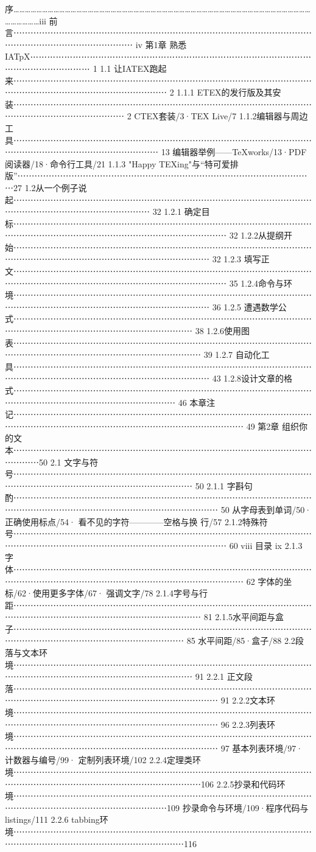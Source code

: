 \documentclass[UTF8]{ctexart}
\begin{document}
序…………………………………………………………………………………………………………………………………………………………iii
前言⋯⋯⋯⋯⋯⋯⋯⋯⋯⋯⋯⋯⋯⋯⋯⋯⋯⋯⋯⋯⋯⋯⋯⋯⋯⋯⋯⋯⋯⋯⋯⋯⋯⋯⋯⋯⋯⋯⋯⋯⋯⋯⋯⋯⋯⋯⋯⋯⋯⋯ iv
第1章	熟悉IATpX⋯⋯⋯⋯⋯⋯⋯⋯⋯⋯⋯⋯⋯⋯⋯⋯⋯⋯⋯⋯⋯⋯⋯⋯⋯⋯⋯⋯⋯⋯⋯⋯⋯⋯⋯⋯⋯⋯⋯⋯⋯⋯⋯ 1
1.1 让IATEX跑起来⋯⋯⋯⋯⋯⋯⋯⋯⋯⋯⋯⋯⋯⋯⋯⋯⋯⋯⋯⋯⋯⋯⋯⋯⋯⋯⋯⋯⋯⋯⋯⋯⋯⋯⋯⋯⋯⋯⋯⋯⋯⋯⋯⋯⋯⋯⋯⋯⋯⋯⋯⋯⋯⋯ 2
1.1.1 ETEX的发行版及其安装⋯⋯⋯⋯⋯⋯⋯⋯⋯⋯⋯⋯⋯⋯⋯⋯⋯⋯⋯⋯⋯⋯⋯⋯⋯⋯⋯⋯⋯⋯⋯⋯⋯⋯⋯⋯⋯⋯⋯⋯⋯⋯⋯⋯⋯⋯⋯⋯⋯ 2
CTEX套装/3·TEX Live/7
1.1.2编辑器与周边工具⋯⋯⋯⋯⋯⋯⋯⋯⋯⋯⋯⋯⋯⋯⋯⋯⋯⋯⋯⋯⋯⋯⋯⋯⋯⋯⋯⋯⋯⋯⋯⋯⋯⋯⋯⋯⋯⋯⋯⋯⋯⋯⋯⋯⋯⋯⋯⋯⋯⋯⋯⋯⋯ 13
编辑器举例——TeXworks/13·PDF阅读器/18·命令行工具/21
1.1.3 "Happy TEXing"与“特可爱排版”⋯⋯⋯⋯⋯⋯⋯⋯⋯⋯⋯⋯⋯⋯⋯⋯⋯⋯⋯⋯⋯⋯⋯⋯⋯⋯⋯⋯⋯⋯⋯⋯⋯⋯⋯27
1.2从一个例子说起⋯⋯⋯⋯⋯⋯⋯⋯⋯⋯⋯⋯⋯⋯⋯⋯⋯⋯⋯⋯⋯⋯⋯⋯⋯⋯⋯⋯⋯⋯⋯⋯⋯⋯⋯⋯⋯⋯⋯⋯⋯⋯⋯⋯⋯⋯⋯⋯⋯⋯⋯⋯ 32
1.2.1 确定目标⋯⋯⋯⋯⋯⋯⋯⋯⋯⋯⋯⋯⋯⋯⋯⋯⋯⋯⋯⋯⋯⋯⋯⋯⋯⋯⋯⋯⋯⋯⋯⋯⋯⋯⋯⋯⋯⋯⋯⋯⋯⋯⋯⋯⋯⋯⋯⋯⋯⋯⋯⋯⋯⋯⋯⋯⋯⋯⋯⋯⋯ 32
1.2.2从提纲开始⋯⋯⋯⋯⋯⋯⋯⋯⋯⋯⋯⋯⋯⋯⋯⋯⋯⋯⋯⋯⋯⋯⋯⋯⋯⋯⋯⋯⋯⋯⋯⋯⋯⋯⋯⋯⋯⋯⋯⋯⋯⋯⋯⋯⋯⋯⋯⋯⋯⋯⋯⋯⋯⋯⋯⋯⋯⋯⋯ 32
1.2.3 填写正文⋯⋯⋯⋯⋯⋯⋯⋯⋯⋯⋯⋯⋯⋯⋯⋯⋯⋯⋯⋯⋯⋯⋯⋯⋯⋯⋯⋯⋯⋯⋯⋯⋯⋯⋯⋯⋯⋯⋯⋯⋯⋯⋯⋯⋯⋯⋯⋯⋯⋯⋯⋯⋯⋯⋯⋯⋯⋯⋯⋯⋯ 35
1.2.4命令与环境⋯⋯⋯⋯⋯⋯⋯⋯⋯⋯⋯⋯⋯⋯⋯⋯⋯⋯⋯⋯⋯⋯⋯⋯⋯⋯⋯⋯⋯⋯⋯⋯⋯⋯⋯⋯⋯⋯⋯⋯⋯⋯⋯⋯⋯⋯⋯⋯⋯⋯⋯⋯⋯⋯⋯⋯⋯⋯⋯ 36
1.2.5 遭遇数学公式⋯⋯⋯⋯⋯⋯⋯⋯⋯⋯⋯⋯⋯⋯⋯⋯⋯⋯⋯⋯⋯⋯⋯⋯⋯⋯⋯⋯⋯⋯⋯⋯⋯⋯⋯⋯⋯⋯⋯⋯⋯⋯⋯⋯⋯⋯⋯⋯⋯⋯⋯⋯⋯⋯⋯⋯⋯ 38
1.2.6使用图表⋯⋯⋯⋯⋯⋯⋯⋯⋯⋯⋯⋯⋯⋯⋯⋯⋯⋯⋯⋯⋯⋯⋯⋯⋯⋯⋯⋯⋯⋯⋯⋯⋯⋯⋯⋯⋯⋯⋯⋯⋯⋯⋯⋯⋯⋯⋯⋯⋯⋯⋯⋯⋯⋯⋯⋯⋯⋯ 39
1.2.7 自动化工具⋯⋯⋯⋯⋯⋯⋯⋯⋯⋯⋯⋯⋯⋯⋯⋯⋯⋯⋯⋯⋯⋯⋯⋯⋯⋯⋯⋯⋯⋯⋯⋯⋯⋯⋯⋯⋯⋯⋯⋯⋯⋯⋯⋯⋯⋯⋯⋯⋯⋯⋯⋯⋯⋯⋯⋯⋯⋯⋯ 43
1.2.8设计文章的格式⋯⋯⋯⋯⋯⋯⋯⋯⋯⋯⋯⋯⋯⋯⋯⋯⋯⋯⋯⋯⋯⋯⋯⋯⋯⋯⋯⋯⋯⋯⋯⋯⋯⋯⋯⋯⋯⋯⋯⋯⋯⋯⋯⋯⋯⋯⋯⋯⋯⋯⋯⋯⋯⋯⋯ 46
本章注记⋯⋯⋯⋯⋯⋯⋯⋯⋯⋯⋯⋯⋯⋯⋯⋯⋯⋯⋯⋯⋯⋯⋯⋯⋯⋯⋯⋯⋯⋯⋯⋯⋯⋯⋯⋯⋯⋯⋯⋯⋯⋯⋯⋯⋯⋯⋯⋯⋯⋯⋯⋯⋯⋯⋯⋯⋯⋯⋯⋯⋯⋯⋯ 49
第2章	组织你的文本⋯⋯⋯⋯⋯⋯⋯⋯⋯⋯⋯⋯⋯⋯⋯⋯⋯⋯⋯⋯⋯⋯⋯⋯⋯⋯⋯⋯⋯⋯⋯⋯⋯⋯⋯⋯⋯⋯⋯50
2.1 文字与符号⋯⋯⋯⋯⋯⋯⋯⋯⋯⋯⋯⋯⋯⋯⋯⋯⋯⋯⋯⋯⋯⋯⋯⋯⋯⋯⋯⋯⋯⋯⋯⋯⋯⋯⋯⋯⋯⋯⋯⋯⋯⋯⋯⋯⋯⋯⋯⋯⋯⋯⋯⋯⋯⋯⋯⋯⋯ 50
2.1.1 字斟句酌⋯⋯⋯⋯⋯⋯⋯⋯⋯⋯⋯⋯⋯⋯⋯⋯⋯⋯⋯⋯⋯⋯⋯⋯⋯⋯⋯⋯⋯⋯⋯⋯⋯⋯⋯⋯⋯⋯⋯⋯⋯⋯⋯⋯⋯⋯⋯⋯⋯⋯⋯⋯⋯⋯⋯⋯⋯⋯⋯⋯ 50
从字母表到单词/50·  正确使用标点/54·  看不见的字符————空格与换
行/57
2.1.2特殊符号⋯⋯⋯⋯⋯⋯⋯⋯⋯⋯⋯⋯⋯⋯⋯⋯⋯⋯⋯⋯⋯⋯⋯⋯⋯⋯⋯⋯⋯⋯⋯⋯⋯⋯⋯⋯⋯⋯⋯⋯⋯⋯⋯⋯⋯⋯⋯⋯⋯⋯⋯⋯⋯⋯⋯⋯⋯⋯⋯⋯⋯ 60
viii
目录	ix
2.1.3 字体⋯⋯⋯⋯⋯⋯⋯⋯⋯⋯⋯⋯⋯⋯⋯⋯⋯⋯⋯⋯⋯⋯⋯⋯⋯⋯⋯⋯⋯⋯⋯⋯⋯⋯⋯⋯⋯⋯⋯⋯⋯⋯⋯⋯⋯⋯⋯⋯⋯⋯⋯⋯⋯⋯⋯⋯⋯⋯⋯⋯⋯⋯⋯ 62
字体的坐标/62·使用更多字体/67·  强调文字/78
2.1.4字号与行距⋯⋯⋯⋯⋯⋯⋯⋯⋯⋯⋯⋯⋯⋯⋯⋯⋯⋯⋯⋯⋯⋯⋯⋯⋯⋯⋯⋯⋯⋯⋯⋯⋯⋯⋯⋯⋯⋯⋯⋯⋯⋯⋯⋯⋯⋯⋯⋯⋯⋯⋯⋯⋯⋯⋯⋯⋯⋯ 81
2.1.5水平间距与盒子⋯⋯⋯⋯⋯⋯⋯⋯⋯⋯⋯⋯⋯⋯⋯⋯⋯⋯⋯⋯⋯⋯⋯⋯⋯⋯⋯⋯⋯⋯⋯⋯⋯⋯⋯⋯⋯⋯⋯⋯⋯⋯⋯⋯⋯⋯⋯⋯⋯⋯⋯⋯⋯⋯⋯⋯ 85
水平间距/85·盒子/88
2.2段落与文本环境⋯⋯⋯⋯⋯⋯⋯⋯⋯⋯⋯⋯⋯⋯⋯⋯⋯⋯⋯⋯⋯⋯⋯⋯⋯⋯⋯⋯⋯⋯⋯⋯⋯⋯⋯⋯⋯⋯⋯⋯⋯⋯⋯⋯⋯⋯⋯⋯⋯⋯⋯⋯⋯⋯⋯⋯⋯ 91
2.2.1 正文段落⋯⋯⋯⋯⋯⋯⋯⋯⋯⋯⋯⋯⋯⋯⋯⋯⋯⋯⋯⋯⋯⋯⋯⋯⋯⋯⋯⋯⋯⋯⋯⋯⋯⋯⋯⋯⋯⋯⋯⋯⋯⋯⋯⋯⋯⋯⋯⋯⋯⋯⋯⋯⋯⋯⋯⋯⋯⋯⋯⋯ 91
2.2.2文本环境⋯⋯⋯⋯⋯⋯⋯⋯⋯⋯⋯⋯⋯⋯⋯⋯⋯⋯⋯⋯⋯⋯⋯⋯⋯⋯⋯⋯⋯⋯⋯⋯⋯⋯⋯⋯⋯⋯⋯⋯⋯⋯⋯⋯⋯⋯⋯⋯⋯⋯⋯⋯⋯⋯⋯⋯⋯⋯⋯⋯ 96
2.2.3列表环境⋯⋯⋯⋯⋯⋯⋯⋯⋯⋯⋯⋯⋯⋯⋯⋯⋯⋯⋯⋯⋯⋯⋯⋯⋯⋯⋯⋯⋯⋯⋯⋯⋯⋯⋯⋯⋯⋯⋯⋯⋯⋯⋯⋯⋯⋯⋯⋯⋯⋯⋯⋯⋯⋯⋯⋯⋯⋯⋯⋯ 97
基本列表环境/97·  计数器与编号/99·  定制列表环境/102
2.2.4定理类环境⋯⋯⋯⋯⋯⋯⋯⋯⋯⋯⋯⋯⋯⋯⋯⋯⋯⋯⋯⋯⋯⋯⋯⋯⋯⋯⋯⋯⋯⋯⋯⋯⋯⋯⋯⋯⋯⋯⋯⋯⋯⋯⋯⋯⋯⋯⋯⋯⋯⋯⋯⋯⋯⋯⋯⋯⋯⋯106
2.2.5抄录和代码环境⋯⋯⋯⋯⋯⋯⋯⋯⋯⋯⋯⋯⋯⋯⋯⋯⋯⋯⋯⋯⋯⋯⋯⋯⋯⋯⋯⋯⋯⋯⋯⋯⋯⋯⋯⋯⋯⋯⋯⋯⋯⋯⋯⋯⋯⋯⋯⋯⋯⋯⋯⋯⋯⋯109
抄录命令与环境/109·程序代码与listings/111
2.2.6 tabbing环境⋯⋯⋯⋯⋯⋯⋯⋯⋯⋯⋯⋯⋯⋯⋯⋯⋯⋯⋯⋯⋯⋯⋯⋯⋯⋯⋯⋯⋯⋯⋯⋯⋯⋯⋯⋯⋯⋯⋯⋯⋯⋯⋯⋯⋯⋯⋯⋯⋯⋯⋯⋯⋯⋯⋯⋯116
\end{document}
